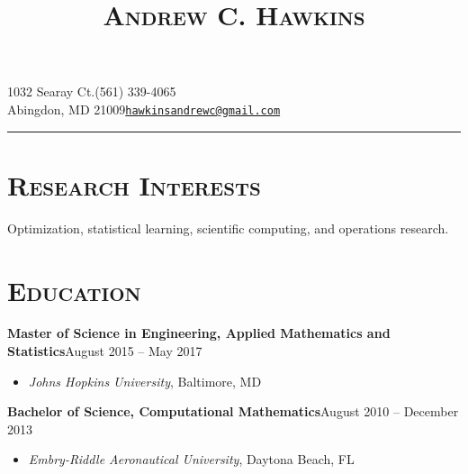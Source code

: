 \documentclass[10pt]{article}
\title{\textsc{\textbf{Andrew C. Hawkins}}\vspace{-13.7ex}}
\date{}
\author{}
\begin{document}
\maketitle

\section*{}
1032 Searay Ct.\hfill (561) 339-4065\\
Abingdon, MD 21009\hfill \texttt{\href{mailto:hawkinsandrewc@gmaeil.com}{hawkinsandrewc@gmail.com}}

\noindent\rule{\textwidth}{1pt}

\section*{\textsc{Research Interests}}
Optimization, statistical learning, scientific computing, and operations research.

\section*{\textsc{Education}}
\textbf{Master of Science in Engineering, Applied Mathematics and Statistics}\hfill August 2015 -- May 2017
\begin{itemize}[noitemsep]
    \item[] \textit{Johns Hopkins University}, Baltimore, MD
\end{itemize}
\vspace{2ex}
\textbf{Bachelor of Science, Computational Mathematics}\hfill August 2010 -- December 2013
\begin{itemize}[noitemsep]
    \item[] \textit{Embry-Riddle Aeronautical University}, Daytona Beach, FL
\end{itemize}
\end{document}

